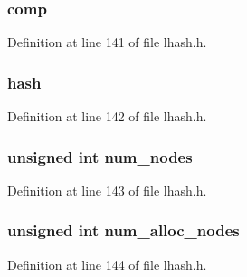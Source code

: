 \subsubsection[{\texorpdfstring{comp}{comp}}]{ comp}\hypertarget{structlhash__st_a1aefa598e71ac2fa7bfc55bfbe5ce4b1}{}\label{structlhash__st_a1aefa598e71ac2fa7bfc55bfbe5ce4b1}


Definition at line 141 of file lhash.\+h.

\subsubsection[{\texorpdfstring{hash}{hash}}]{ {\bf hash}}\hypertarget{structlhash__st_abb5277d75bed035d42fbb555426aa608}{}\label{structlhash__st_abb5277d75bed035d42fbb555426aa608}


Definition at line 142 of file lhash.\+h.

\subsubsection[{\texorpdfstring{num\+\_\+nodes}{num_nodes}}]{\setlength{\rightskip}{0pt plus 5cm}unsigned int num\+\_\+nodes}\hypertarget{structlhash__st_a19f9fccebb24ffbc3580ea2a78a8a424}{}\label{structlhash__st_a19f9fccebb24ffbc3580ea2a78a8a424}


Definition at line 143 of file lhash.\+h.

\subsubsection[{\texorpdfstring{num\+\_\+alloc\+\_\+nodes}{num_alloc_nodes}}]{\setlength{\rightskip}{0pt plus 5cm}unsigned int num\+\_\+alloc\+\_\+nodes}\hypertarget{structlhash__st_a99138a02e6ed3f01c2188bb7b9290f96}{}\label{structlhash__st_a99138a02e6ed3f01c2188bb7b9290f96}


Definition at line 144 of file lhash.\+h.

